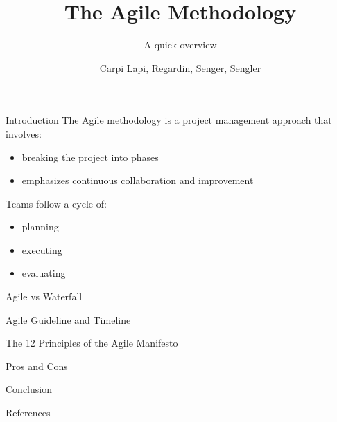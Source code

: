 \documentclass[10pt]{beamer}
\title{The Agile Methodology}
\subtitle{A quick overview}
\author{Carpi Lapi, Regardin, Senger, Sengler}
\begin{document}
\begin{frame}
  \titlepage
\end{frame}

\begin{frame}{Introduction}
  The Agile methodology is a project management approach that involves:
\begin{itemize}
    \item breaking the project into phases
    \item emphasizes continuous collaboration and improvement \\
    \vspace{1cm}
\end{itemize}

Teams follow a cycle of: 
\begin{itemize}
    \item planning
    \item executing
    \item evaluating
\end{itemize}
\end{frame}

\begin{frame}{Agile vs Waterfall}
\end{frame}

\begin{frame}{Agile Guideline and Timeline}
\end{frame}

\begin{frame}{The 12 Principles of the Agile Manifesto}
\end{frame}

\begin{frame}{Pros and Cons}
\end{frame}

\begin{frame}{Conclusion}
\end{frame}

\begin{frame}{References}
\end{frame}
\end{document}
